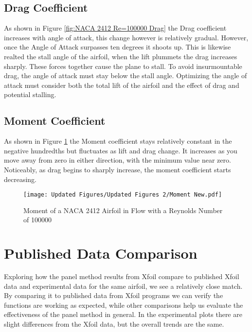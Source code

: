 \documentclass{article}
\begin{document}
\subsection{Drag Coefficient}
As shown in Figure \ref{fig:NACA 2412 Re=100000 Drag} the Drag coefficient increases with angle of attack, this change however is relatively gradual. However, once the Angle of Attack surpasses ten degrees it shoots up. This is likewise realted the stall angle of the airfoil, when the lift plummets the drag increases sharply. These forces together cause the plane to stall. To avoid insurmountable drag, the angle of attack must stay below the stall angle. Optimizing the angle of attack must consider both the total lift of the airfoil and the effect of drag and potential stalling.


\subsection{Moment Coefficient}
As shown in Figure \ref{fig:NACA 2412 Re=100000 Moment} the Moment coefficient stays relatively constant in the negative hundredths but fluctuates as lift and drag change. It increases as you move away from zero in either direction, with the minimum value near zero. Noticeably, as drag begins to sharply increase, the moment coefficient starts decreasing.

\begin{figure}[h]
\centering
\texttt{[image: Updated Figures/Updated Figures 2/Moment New.pdf]}
\caption{\label{fig:NACA 2412 Re=100000 Moment}Moment of a NACA 2412 Airfoil in Flow with a Reynolds Number of 100000}
\end{figure}

\section{Published Data Comparison}
Exploring how the panel method results from Xfoil compare  to published Xfoil data and experimental data for the same airfoil, we see a relatively close match. By comparing it to published data from Xfoil programs we can verify the functions are working as expected, while other comparisons help us evaluate the effectiveness of the panel method in general. In the experimental plots there are slight differences from the Xfoil data, but the overall trends are the same.
\end{document}
